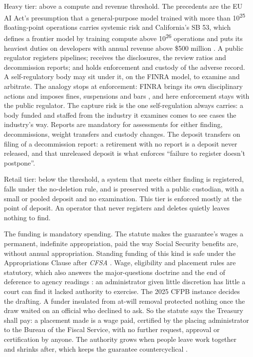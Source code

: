Heavy tier: above a compute and revenue threshold. The precedents are the EU AI Act's presumption that a general-purpose model trained with more than 10\textsuperscript{25} floating-point operations carries systemic risk \autocite[art.~51(2)]{eu2024aiact} and California's SB 53, which defines a frontier model by training compute above 10\textsuperscript{26} operations and puts its heaviest duties on developers with annual revenue above \$500 million \autocite[§~22757.11]{CA2025SB53}. A public regulator registers pipelines; receives the disclosures, the review ratios and decommission reports; and holds enforcement and custody of the adverse record. A self-regulatory body may sit under it, on the FINRA model, to examine and arbitrate. The analogy stops at enforcement: FINRA brings its own disciplinary actions and imposes fines, suspensions and bars \autocite{FINRA2026Enforcement}, and here enforcement stays with the public regulator. The capture risk is the one self-regulation always carries: a body funded and staffed from the industry it examines comes to see cases the industry's way. Reports are mandatory for assessments for either finding, decommissions, weight transfers and custody changes. The deposit transfers on filing of a decommission report: a retirement with no report is a deposit never released, and that unreleased deposit is what enforces “failure to register doesn't postpone”.

Retail tier: below the threshold, a system that meets either finding is registered, falls under the no-deletion rule, and is preserved with a public custodian, with a small or pooled deposit and no examination. This tier is enforced mostly at the point of deposit. An operator that never registers and deletes quietly leaves nothing to find.


The funding is mandatory spending. The statute makes the guarantee's wages a permanent, indefinite appropriation, paid the way Social Security benefits are, without annual appropriation. Standing funding of this kind is safe under the Appropriations Clause after \emph{CFSA} \autocite{cfpb2024cfsa}. Wage, eligibility and placement rules are statutory, which also answers the major-questions doctrine and the end of deference to agency readings \autocite{westvirginia2022,loperbright2024}: an administrator given little discretion has little a court can find it lacked authority to exercise. The 2025 CFPB instance decides the drafting. A funder insulated from at-will removal protected nothing once the draw waited on an official who declined to ask. So the statute says the Treasury shall pay: a placement made is a wage paid, certified by the placing administrator to the Bureau of the Fiscal Service, with no further request, approval or certification by anyone. The authority grows when people leave work together and shrinks after, which keeps the guarantee countercyclical \autocite{tcherneva2020case}.

